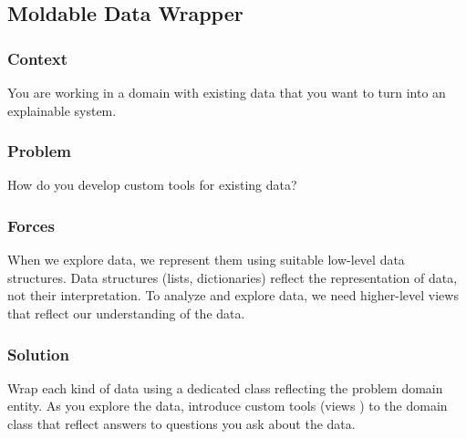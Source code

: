\documentclass[sigconf]{acmart}
\renewcommand{\nbc}[3]{} %
\newcommand\on[1]{\nbc{ON}{#1}{olive}} %
\newcommand\tg[1]{\nbc{TG}{#1}{blue}}
\newcommand\kh[1]{\nbc{Konrad}{#1}{violet}}
\newcommand\eog[1]{\nbc{Edward}{#1}{purple}}
\begin{document}

\subsection*{Moldable Data Wrapper}\label{pat:moldableDataWrapper}


\subsubsection*{Context}
You are working in a domain with existing data that you want to turn into an explainable system.

\subsubsection*{Problem}
How do you develop custom tools for existing data?

\subsubsection*{Forces}
When we explore data, we represent them using suitable low-level data structures.
Data structures (lists, dictionaries) reflect the representation of data, not their interpretation.
To analyze and explore data, we need higher-level views that reflect our understanding of the data.

\subsubsection*{Solution}
Wrap each kind of data using a dedicated class reflecting the problem domain entity.
As you explore the data, introduce custom tools (views \etc) to the domain class that reflect answers to questions you ask about the data.

\end{document}
